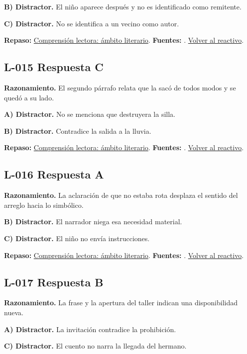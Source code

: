 \textbf{B) Distractor. }El niño aparece después y no es identificado como remitente.

\textbf{C) Distractor. }No se identifica a un vecino como autor.

\textbf{Repaso:} \hyperref[sec:l2]{Comprensión lectora: ámbito literario}. \textbf{Fuentes:} \cite{ceneval,reading}. \hyperref[q:L-014]{Volver al reactivo}.\par\medskip

\subsection*{L-015 \quad Respuesta C}\label{s:L-015}
\textbf{Razonamiento.} El segundo párrafo relata que la sacó de todos modos y se quedó a su lado.

\textbf{A) Distractor. }No se menciona que destruyera la silla.

\textbf{B) Distractor. }Contradice la salida a la lluvia.

\textbf{Repaso:} \hyperref[sec:l2]{Comprensión lectora: ámbito literario}. \textbf{Fuentes:} \cite{ceneval,reading}. \hyperref[q:L-015]{Volver al reactivo}.\par\medskip

\subsection*{L-016 \quad Respuesta A}\label{s:L-016}
\textbf{Razonamiento.} La aclaración de que no estaba rota desplaza el sentido del arreglo hacia lo simbólico.

\textbf{B) Distractor. }El narrador niega esa necesidad material.

\textbf{C) Distractor. }El niño no envía instrucciones.

\textbf{Repaso:} \hyperref[sec:l2]{Comprensión lectora: ámbito literario}. \textbf{Fuentes:} \cite{ceneval,reading}. \hyperref[q:L-016]{Volver al reactivo}.\par\medskip

\subsection*{L-017 \quad Respuesta B}\label{s:L-017}
\textbf{Razonamiento.} La frase y la apertura del taller indican una disponibilidad nueva.

\textbf{A) Distractor. }La invitación contradice la prohibición.

\textbf{C) Distractor. }El cuento no narra la llegada del hermano.

